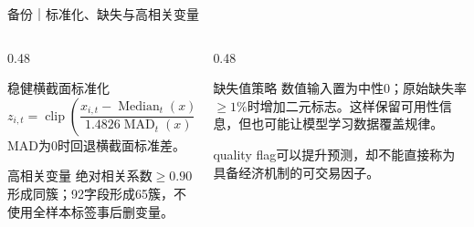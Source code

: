 \documentclass[aspectratio=169,10pt]{beamer}
\begin{document}
\begin{frame}{备份｜标准化、缺失与高相关变量}
  \begin{columns}[T,onlytextwidth]
    \begin{column}{0.48\textwidth}
      \begin{block}{稳健横截面标准化}
        \begin{equation*}
          z_{i,t}=\operatorname{clip}\!\left(
          \frac{x_{i,t}-\operatorname{Median}_t(x)}{1.4826\operatorname{MAD}_t(x)},-5,5\right)
        \end{equation*}
        MAD为0时回退横截面标准差。
      \end{block}
      \begin{block}{高相关变量}
        绝对相关系数$\ge0.90$形成同簇；92字段形成65簇，不使用全样本标签事后删变量。
      \end{block}
    \end{column}
    \begin{column}{0.48\textwidth}
      \begin{alertblock}{缺失值策略}
        数值输入置为中性0；原始缺失率$\ge1\%$时增加二元标志。这样保留可用性信息，但也可能让模型学习数据覆盖规律。
      \end{alertblock}
      \begin{takeaway}[解释纪律]
        quality flag可以提升预测，却不能直接称为具备经济机制的可交易因子。
      \end{takeaway}
    \end{column}
  \end{columns}
\end{frame}
\end{document}
